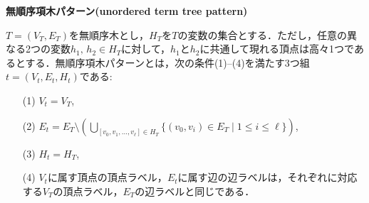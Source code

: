 \begin{define}{\bf 無順序項木パターン(unordered term tree pattern)}\par
  $T=(V_T,E_T)$を無順序木とし，$H_T$を$T$の変数の集合とする．ただし，任意の異なる2つの変数$h_1,\,h_2\in H_T$に対して，$h_1$と$h_2$に共通して現れる頂点は高々1つであるとする．無順序項木パターンとは，次の条件(1)--(4)を満たす3つ組$t=(V_t,E_t,H_t)$である:
  \begin{enumerate}
    \item[(1)] $V_t=V_T$,
    \item[(2)] $E_t=E_T\setminus \left(\bigcup_{[v_0,v_1,\ldots,v_{\ell}]\in H_T}\{(v_0,v_i)\in E_T\mid 1\leq i\leq \ell\}\right)$,
    \item[(3)] $H_t=H_T$,
    \item[(4)] $V_t$に属す頂点の頂点ラベル，$E_t$に属す辺の辺ラベルは，それぞれに対応する$V_T$の頂点ラベル，$E_T$の辺ラベルと同じである．
  \end{enumerate}
\end{define}


